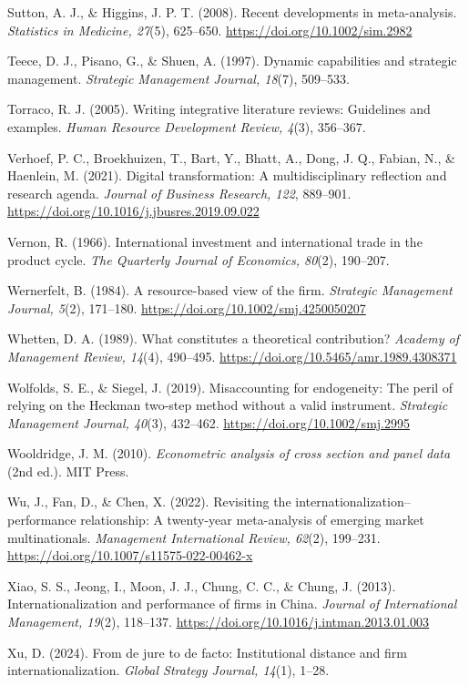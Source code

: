 \documentclass[
  a4paper,
  13pt]{extreport}
\begin{document}
Sutton, A. J., \& Higgins, J. P. T. (2008). Recent developments in
meta-analysis. \emph{Statistics in Medicine, 27}(5), 625--650.
\url{https://doi.org/10.1002/sim.2982}

Teece, D. J., Pisano, G., \& Shuen, A. (1997). Dynamic capabilities and
strategic management. \emph{Strategic Management Journal, 18}(7),
509--533.

Torraco, R. J. (2005). Writing integrative literature reviews:
Guidelines and examples. \emph{Human Resource Development Review, 4}(3),
356--367.

Verhoef, P. C., Broekhuizen, T., Bart, Y., Bhatt, A., Dong, J. Q.,
Fabian, N., \& Haenlein, M. (2021). Digital transformation: A
multidisciplinary reflection and research agenda. \emph{Journal of
Business Research, 122}, 889--901.
\url{https://doi.org/10.1016/j.jbusres.2019.09.022}

Vernon, R. (1966). International investment and international trade in
the product cycle. \emph{The Quarterly Journal of Economics, 80}(2),
190--207.

Wernerfelt, B. (1984). A resource-based view of the firm.
\emph{Strategic Management Journal, 5}(2), 171--180.
\url{https://doi.org/10.1002/smj.4250050207}

Whetten, D. A. (1989). What constitutes a theoretical contribution?
\emph{Academy of Management Review, 14}(4), 490--495.
\url{https://doi.org/10.5465/amr.1989.4308371}

Wolfolds, S. E., \& Siegel, J. (2019). Misaccounting for endogeneity:
The peril of relying on the Heckman two-step method without a valid
instrument. \emph{Strategic Management Journal, 40}(3), 432--462.
\url{https://doi.org/10.1002/smj.2995}

Wooldridge, J. M. (2010). \emph{Econometric analysis of cross section
and panel data} (2nd ed.). MIT Press.

Wu, J., Fan, D., \& Chen, X. (2022). Revisiting the
internationalization--performance relationship: A twenty-year
meta-analysis of emerging market multinationals. \emph{Management
International Review, 62}(2), 199--231.
\url{https://doi.org/10.1007/s11575-022-00462-x}

Xiao, S. S., Jeong, I., Moon, J. J., Chung, C. C., \& Chung, J. (2013).
Internationalization and performance of firms in China. \emph{Journal of
International Management, 19}(2), 118--137.
\url{https://doi.org/10.1016/j.intman.2013.01.003}

Xu, D. (2024). From de jure to de facto: Institutional distance and firm
internationalization. \emph{Global Strategy Journal, 14}(1), 1--28.
\end{document}
